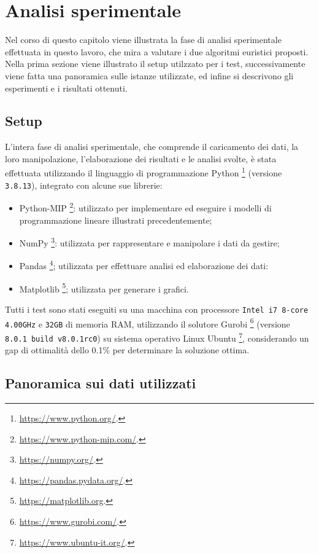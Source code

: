 \chapter{Analisi sperimentale}
\label{cap:analisi-sperimentale}

Nel corso di questo capitolo viene illustrata la fase di analisi sperimentale effettuata in questo lavoro, che mira a valutare i due algoritmi euristici proposti. Nella prima sezione viene illustrato il setup utilzzato per i test, successivamente viene fatta una panoramica sulle istanze utilizzate, ed infine si descrivono gli esperimenti e i risultati ottenuti.


%
%
\section{Setup}
\label{sec:setup}

L'intera fase di analisi sperimentale, che comprende il caricamento dei dati, la loro manipolazione, l'elaborazione dei risultati e le analisi svolte, è stata effettuata utilizzando il linguaggio di programmazione Python \footnote{\url{https://www.python.org/}.} (versione \texttt{3.8.13}), integrato con alcune sue librerie:
\begin{itemize}
    \item Python-MIP \footnote{\url{https://www.python-mip.com/}.}: utilizzato per implementare ed eseguire i modelli di programmazione lineare illustrati precedentemente;
    \item NumPy \footnote{\url{https://numpy.org/}.}: utilizzata per rappresentare e manipolare i dati da gestire;
    \item Pandas \footnote{\url{https://pandas.pydata.org/}.}; utilizzata per effettuare analisi ed elaborazione dei dati:
    \item Matplotlib \footnote{\url{https://matplotlib.org}.}; utilizzata per generare i grafici.
\end{itemize}
Tutti i test sono stati eseguiti su una macchina con processore \texttt{Intel i7 8-core 4.00GHz} e \texttt{32GB} di memoria RAM, utilizzando il solutore Gurobi \footnote{\url{https://www.gurobi.com/}.} (versione \texttt{8.0.1 build v8.0.1rc0}) su sistema operativo Linux Ubuntu \footnote{\url{https://www.ubuntu-it.org/}.}, considerando un gap di ottimalità dello 0.1\% per determinare la soluzione ottima.


%
%
\section{Panoramica sui dati utilizzati}
\label{sec:dati-utilizzati}

